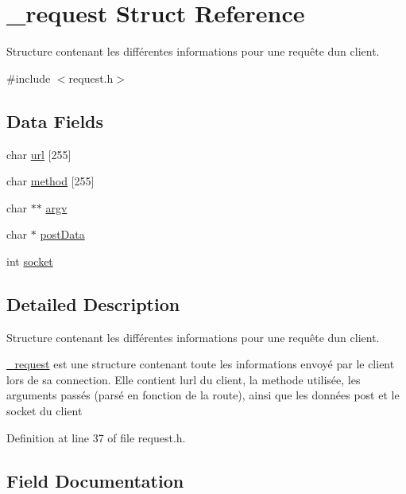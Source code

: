 \hypertarget{struct__request}{}\section{\+\_\+request Struct Reference}
\label{struct__request}


Structure contenant les différentes informations pour une requête d\textquotesingle{}un client.  




{\ttfamily \#include $<$request.\+h$>$}

\subsection*{Data Fields}
\begin{DoxyCompactItemize}
\item 
char \mbox{\hyperlink{struct__request_ac30a6dcbeca564ac73913a3df8a821b9}{url}} \mbox{[}255\mbox{]}
\item 
char \mbox{\hyperlink{struct__request_aa97bc4e02a581ea6bb8f7b704dc1169e}{method}} \mbox{[}255\mbox{]}
\item 
char $\ast$$\ast$ \mbox{\hyperlink{struct__request_af2efa898e9eed6fe6715279cb1ec35b0}{argv}}
\item 
char $\ast$ \mbox{\hyperlink{struct__request_a085deaaceab1baf1c9408775106b2272}{post\+Data}}
\item 
int \mbox{\hyperlink{struct__request_a3666576f6b88007cc7b8f26c7da596c8}{socket}}
\end{DoxyCompactItemize}


\subsection{Detailed Description}
Structure contenant les différentes informations pour une requête d\textquotesingle{}un client. 

\mbox{\hyperlink{struct__request}{\+\_\+request}} est une structure contenant toute les informations envoyé par le client lors de sa connection. Elle contient l\textquotesingle{}url du client, la methode utilisée, les arguments passés (parsé en fonction de la route), ainsi que les données post et le socket du client 

Definition at line 37 of file request.\+h.



\subsection{Field Documentation}
\mbox{\label{struct__request_af2efa898e9eed6fe6715279cb1ec35b0}} 
